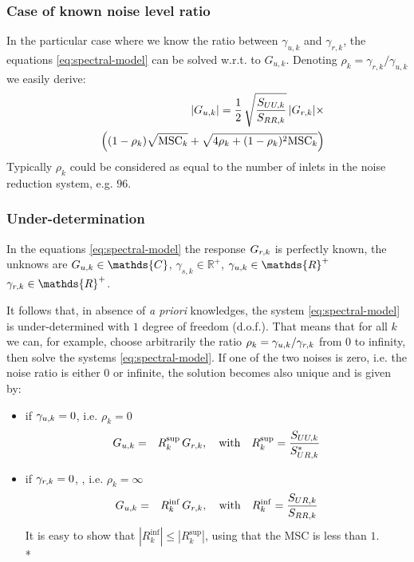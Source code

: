 \subsubsection{Case of known noise level ratio}
In the particular case where we know the ratio between $\gamma_{u,k}$ and  $\gamma_{r,k}$, the equations \eqref{eq:spectral-model} can be solved w.r.t. to $G_{u,k}$. Denoting $\rho_{k}=\gamma_{r,k}/\gamma_{u,k}$ we easily derive:
\begin{eqnarray}
\label{eq:known-noise-ratio}
&&\hspace{-1cm}|G_{\ut,k}|=
\frac{1}{2}\,\sqrt{\frac{S_{UU,k}}{S_{RR,k}}}\,|G_{\rf, k}|\times 
\\&&\nonumber
\left(
(1-\rho_{k})\sqrt{\MSC_{k}}+\sqrt{4\rho_{k}+(1-\rho_{k})^{2}\MSC_{k}}
\right)
\end{eqnarray}
Typically $\rho_{k}$ could be considered as equal to the number of inlets in the noise reduction system, e.g. $96$.




\subsubsection{Under-determination}
In the equations \eqref{eq:spectral-model} the response $G_{{r},k}$ is perfectly known, the unknows are $G_{\ut,k}\in\mathds{C}$, $\gamma_{s,k}\in\mathds{R}^{+}$,  $\gamma_{\ut,k}\in\mathds{R}^{+}$
$\gamma_{\rf,k}\in\mathds{R}^{+}$. 
 
It follows that, in absence of {\it a priori} knowledges,  the system \eqref{eq:spectral-model} is under-determined with $1$ degree of freedom (d.o.f.). That means that for all $k$ we can, for example,  choose arbitrarily the ratio $\rho_{k}=\gamma_{{u},k}/\gamma_{{r},k}$ from $0$ to infinity, then solve the systems \eqref{eq:spectral-model}. If one of the two noises is zero, i.e. the noise ratio is either 0 or infinite, the solution becomes also unique and is given by:





\begin{itemize}
\item
if $\gamma_{{u},k}=0$, i.e. $\rho_{k}=0$
\begin{eqnarray}
\label{eq:ratio-sup-bis-exact}
{G_{{u},k}}&=&R_{k}^{\sup}\,G_{{r},k}, \quad \mathrm{with}\quad
R_{k}^{\sup} = \frac{{S_{UU,k}}}{{S^*_{UR,k}}}
\end{eqnarray}
\item
if $\gamma_{{r},k}=0$, , i.e. $\rho_{k}=\infty$
\begin{eqnarray}
\label{eq:ratio-inf-bis-exact}
{G_{{u},k}}&=&R_{k}^{\inf}\,G_{{r},k}, \quad \mathrm{with}\quad
R_{k}^{\inf}=\frac{{S_{UR,k}}}{{S_{RR,k}}}
\end{eqnarray}
It is easy to show that $|R_{k}^{\inf}|\leq |R_{k}^{\sup}|$, using that the MSC is less than $1$.\\*
\end{itemize}

